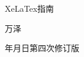 \documentclass[12pt,oneside]{book}
\begin{document}
\makeatletter
\renewcommand\title[1]{\def\@title{#1}}
\newcommand\subtitle[1]{\def\@subtitle{#1}}
\renewcommand\author[1]{\def\@author{#1}}
\newcommand\version[1]{\def\@version{#1}}
\renewcommand\date[1]{\def\@date{#1}}

\renewcommand{\today}{\number\year{}年\number\month{}月\number\day{}日}
\subtitle{}
\date{\today}
\version{}

\title{XeLaTex指南}
\author{万泽}
\version{第四次修订版}

\begin{titlepage}
\begin{center}
\vspace*{120pt}
{\fontsize{80pt}{40pt}\selectfont\sffamily \@title}

\vspace{40pt}
{\fontsize{40pt}{20pt}\selectfont\sffamily \@subtitle} 

\vspace{200pt}
{\fontsize{40pt}{20pt}\selectfont\sffamily \@author}

\vspace{150pt}
{\fontsize{30pt}{20pt}\selectfont\ttfamily \@date \@version}

\end{center}
\end{titlepage}

\makeatother
\end{document}
